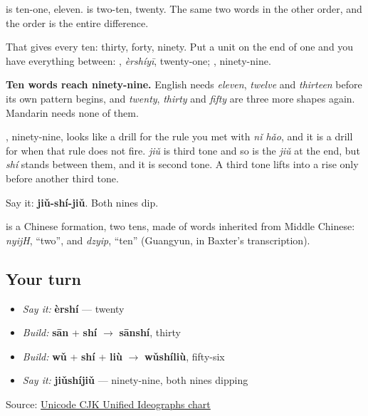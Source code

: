 \textbf{} is ten-one, eleven. \textbf{} is two-ten, twenty. The same two words in the other order, and the order is the entire difference.

That gives every ten: \textbf{} thirty, \textbf{} forty, \textbf{} ninety. Put a unit on the end of one and you have everything between: \textbf{}, \emph{èrshíyī}, twenty-one; \textbf{}, ninety-nine.

\textbf{Ten words reach ninety-nine.} English needs \emph{eleven}, \emph{twelve} and \emph{thirteen} before its own pattern begins, and \emph{twenty}, \emph{thirty} and \emph{fifty} are three more shapes again. Mandarin needs none of them.

\begin{sounds}
\textbf{}, ninety-nine, looks like a drill for the rule you met with \emph{nǐ hǎo}, and it is a drill for when that rule does not fire. \emph{jiǔ} is third tone and so is the \emph{jiǔ} at the end, but  \emph{shí} stands between them, and it is second tone. A third tone lifts into a rise only before another third tone.

Say it: \textbf{jiǔ-shí-jiǔ}. Both nines dip.
\end{sounds}

\begin{cousinweb}
\textbf{} is a Chinese formation, two tens, made of words inherited from Middle Chinese: \emph{nyijH}, \textquotedblleft{}two\textquotedblright{}, and \emph{dzyip}, \textquotedblleft{}ten\textquotedblright{} (Guangyun, in Baxter's transcription).
\end{cousinweb}

\subsection*{Your turn}
\begin{itemize}
\raggedright
  \item \emph{Say it:} \textbf{èrshí} — twenty
  \item \emph{Build:} \textbf{sān} + \textbf{shí} $\to$ \textbf{sānshí}, thirty
  \item \emph{Build:} \textbf{wǔ} + \textbf{shí} + \textbf{liù} $\to$ \textbf{wǔshíliù}, fifty-six
  \item \emph{Say it:} \textbf{jiǔshíjiǔ} — ninety-nine, both nines dipping
\end{itemize}

\begin{tcolorbox}[breakable,colback=teal!4,colframe=teal!35!black,title={Before you move on}]
Source: \href{https://www.unicode.org/charts/PDF/U4E00.pdf}{Unicode CJK Unified Ideographs chart}
\end{tcolorbox}
